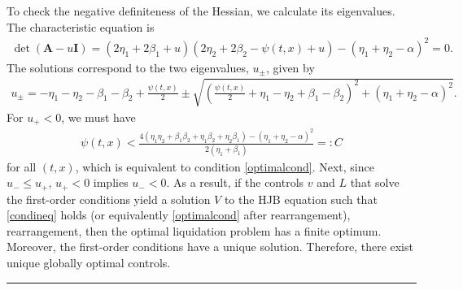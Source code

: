 \documentclass[12pt, letterpaper]{article}
\newenvironment{proof}[1][Proof]{\text{#1.} }{\ \rule{0.5em}{0.5em}}
\numberwithin{equation}{section}
\numberwithin{theorem}{section}
\begin{document}
\begin{proof}
To check the negative definiteness of the Hessian, we calculate its eigenvalues. The characteristic equation is
\begin{align}
\det(\textbf{A}-u\textbf{I})=(2\eta_1+2\beta_1+u)(2\eta_2+2\beta_2-\psi(t,x)+u)-\left(\eta_1+\eta_2-\alpha\right)^2=0.
\end{align}
The solutions correspond to the two  eigenvalues, $u_{\pm}$, given by \begin{align}
u_{\pm}=-\eta_1-\eta_2-\beta_1-\beta_2+\frac{\psi(t,x)}{2}\pm\sqrt{\left(\frac{\psi(t,x)}{2}+\eta_1-\eta_2+\beta_1-\beta_2\right)^2+\left(\eta_1+\eta_2-\alpha\right)^2}.
\end{align} 
For $u_+<0$, we must have
\begin{align}
\psi(t,x)<\frac{4(\eta_1\eta_2+\beta_1\beta_2+\eta_1\beta_2+\eta_2\beta_1)-\left(\eta_1+\eta_2-\alpha\right)^2}{2(\eta_1+\beta_1)}=:C\label{condineq}
\end{align} 
for all $(t,x)$, which is equivalent to condition \eqref{optimalcond}. Next, since $u_-\le u_+$, $u_+<0$ implies $u_-<0$. As a result, if the controls $v$ and $L$ that solve the first-order conditions yield a solution $V$ to the HJB equation such that \eqref{condineq} holds (or equivalently \eqref{optimalcond} after rearrangement), rearrangement, then the optimal liquidation problem has a finite optimum. Moreover, the first-order conditions have a unique solution. Therefore, there exist unique globally optimal controls.\end{proof}


\end{document}
